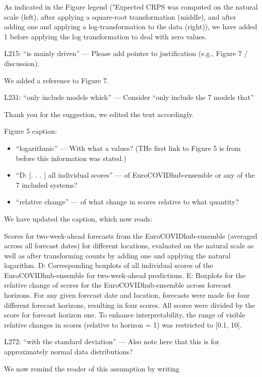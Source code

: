 \documentclass{article}
\newcommand{\black}{\color{black}}
\newcommand{\blue}{\color{blue}}
\newcommand{\indented}{\setlength{\leftskip}{1cm}}
\newcommand{\notindented}{\setlength{\leftskip}{0cm}}
\begin{document}
\black 
As indicated in the Figure legend ("Expected CRPS was computed on the natural scale (left), after applying a square-root transformation (middle), and after adding one and applying a log-transformation to the data (right)), we have added 1 before applying the log transformation to deal with zero values. 


\blue
L215: “is mainly driven” — Please add pointer to justification (e.g., Figure 7 / discussion).

\black
We added a reference to Figure 7. 

\blue
L231: “only include models which” — Consider “only include the 7 models that”

\black
Thank you for the suggestion, we edited the text accordingly. 

\blue
Figure 5 caption:
\begin{itemize}
    \item “logarithmic” — With what a values? (THe first link to Figure 5 is from before this information was stated.)
    \item “D: [. . . ] all individual scores” — of EuroCOVIDhub-ensemble or any of the 7 included systems?
    \item “relative change” — of what change in scores relative to what quantity?
\end{itemize}

\black
We have updated the caption, which now reads: 

\indented
Scores for two-week-ahead forecasts from the EuroCOVIDhub-ensemble (averaged across all forecast dates) for different locations, evaluated on the natural scale as well as after transforming counts by adding one and applying the natural logarithm. D: Corresponding boxplots of all individual scores of the EuroCOVIDhub-ensemble for two-week-ahead predictions. E: Boxplots for the relative change of scores for the EuroCOVIDhub-ensemble across forecast horizons. For any given forecast date and location, forecasts were made for four different forecast horizons, resulting in four scores. All scores were divided by the score for forecast horizon one. To enhance interpretability, the range of visible relative changes in scores (relative to horizon = 1) was restricted to [0.1, 10].

\notindented

\blue
L272: “with the standard deviation” — Also note here that this is for approximately normal data distributions?

\black 
We now remind the reader of this assumption by writing
\end{document}

